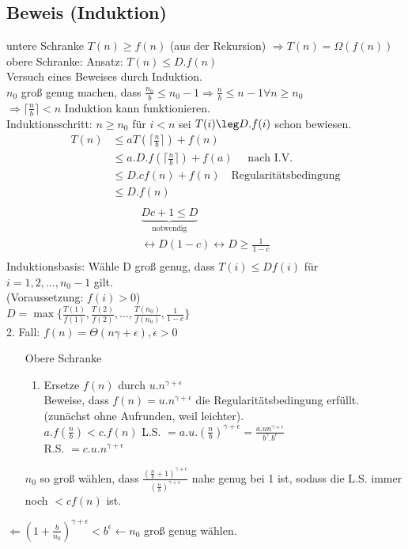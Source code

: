 \subsection*{Beweis (Induktion)}
untere Schranke $T(n) \geq f(n)$ (aus der Rekursion) $\Rightarrow T(n) = \Omega(f(n))$\\
obere Schranke: Ansatz: $T(n) \leq D.f(n)$\\
Versuch eines Beweises durch Induktion.\\
$n_0$ groß genug machen, dass $\frac{n_0}{b} \leq n_0 -1\Rightarrow \frac{n}{b} \leq n-1 \forall n \geq n_0$\\
$\Rightarrow \lceil \frac{n}{b} \rceil < n$ Induktion kann funktionieren.\\
Induktionsschritt: $n \geq n_0$ für $i < n$ sei $T(i) \leg D.f(i)$ schon bewiesen.\\
\begin{align*}
T(n) & \leq a T(\lceil \frac{n}{b} \rceil) + f(n)\\
& \leq a.D.f(\lceil \frac{n}{b} \rceil) + f(a) \quad \text{ nach I.V.}\\
& \leq D.cf(n) + f(n) \quad \text{Regularitätsbedingung}\\
& \leq D.f(n)\\
\end{align*}
\begin{align*}
\underbrace{Dc+1 \leq D}_{\text{notwendig}}\\
\leftrightarrow D(1-c) \leftrightarrow D \geq \frac{1}{1-c}\\
\end{align*}
Induktionsbasis: Wähle D groß genug, dass $T(i) \leq Df(i)$ für $i=1,2,...,n_0-1$ gilt.\\
(Voraussetzung: $f(i) > 0$)\\
$D = \max\{\frac{T(1)}{f(1)},\frac{T(2)}{f(2)},\dots,\frac{T(n_0)}{f(n_0)},\frac{1}{1-c}\}$\\
2. Fall: $f(n)=\Theta(n{\gamma + \epsilon}), \epsilon > 0$
\begin{enumerate}
\item[Obere Schranke]
\begin{enumerate}
\item Ersetze $f(n)$ durch $u.n^{\gamma + \epsilon}$\\
Beweise, dass $f(n) = u.n^{\gamma + \epsilon}$ die Regularitätsbedingung erfüllt. (zunächst ohne Aufrunden, weil leichter).\\%
$a.f(\frac{n}{b}) < c.f(n)$
L.S. $= a.u.(\frac{n}{b})^{\gamma + \epsilon} = \frac{a.u n^{\gamma + \epsilon}}{b^\gamma . b^\epsilon}$\\
R.S. $= c.u.n^{\gamma + \epsilon}$
\end{enumerate}
$n_0$ so groß wählen, dass $\frac{(\frac{n}{b}+1)^{\gamma + \epsilon}}{(\frac{n}{b})^{\gamma + \epsilon}}$ nahe genug bei 1 ist, sodass die L.S. immer noch $< cf(n)$ ist.\\
\end{enumerate}
$\Leftarrow (1+\frac{b}{n_0})^{\gamma	+ \epsilon} < b^\epsilon \leftarrow n_0$ groß genug wählen.  
